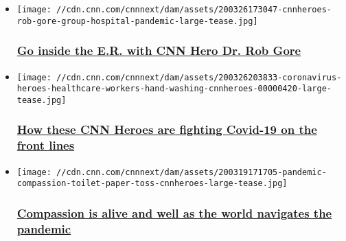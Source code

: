 \begin{itemize}
\item
  \href{/2020/04/05/health/inside-new-york-coronavirus-hospital/index.html}{}

  \texttt{[image: //cdn.cnn.com/cnnnext/dam/assets/200326173047-cnnheroes-rob-gore-group-hospital-pandemic-large-tease.jpg]}

  \hypertarget{go-inside-the-er-with-cnn-hero-dr-rob-gore}{%
  \subsubsection{\texorpdfstring{\href{/2020/04/05/health/inside-new-york-coronavirus-hospital/index.html}{Go
  inside the E.R. with CNN Hero Dr. Rob
  Gore}}{Go inside the E.R. with CNN Hero Dr. Rob Gore}}\label{go-inside-the-er-with-cnn-hero-dr-rob-gore}}
\end{itemize}

\begin{itemize}
\item
  \href{/2020/03/26/world/coronavirus-front-lines-medical-care-hygiene-cnnheroes/index.html}{}

  \texttt{[image: //cdn.cnn.com/cnnnext/dam/assets/200326203833-coronavirus-heroes-healthcare-workers-hand-washing-cnnheroes-00000420-large-tease.jpg]}

  \hypertarget{how-these-cnn-heroes-are-fighting-covid-19-on-the-front-lines}{%
  \subsubsection{\texorpdfstring{\href{/2020/03/26/world/coronavirus-front-lines-medical-care-hygiene-cnnheroes/index.html}{How
  these CNN Heroes are fighting Covid-19 on the front
  lines}}{How these CNN Heroes are fighting Covid-19 on the front lines}}\label{how-these-cnn-heroes-are-fighting-covid-19-on-the-front-lines}}
\end{itemize}

\begin{itemize}
\item
  \href{/2020/03/19/world/everyday-heroes-help-during-coronavirus-crisis-cnnheroes/index.html}{}

  \texttt{[image: //cdn.cnn.com/cnnnext/dam/assets/200319171705-pandemic-compassion-toilet-paper-toss-cnnheroes-large-tease.jpg]}

  \hypertarget{compassion-is-alive-and-well-as-the-world-navigates-the-pandemic}{%
  \subsubsection{\texorpdfstring{\href{/2020/03/19/world/everyday-heroes-help-during-coronavirus-crisis-cnnheroes/index.html}{Compassion
  is alive and well as the world navigates the
  pandemic}}{Compassion is alive and well as the world navigates the pandemic}}\label{compassion-is-alive-and-well-as-the-world-navigates-the-pandemic}}
\end{itemize}

